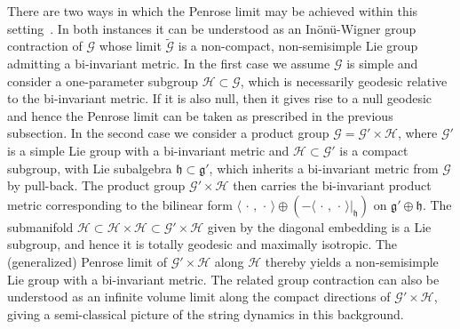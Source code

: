 \documentclass[11pt,a4paper]{article}
\begin{document}
There are two ways in which the Penrose limit may be achieved within
this setting~\cite{BFP1}. In both instances it can be understood as an
In\"on\"u-Wigner group contraction of $\mathcal{G}$ whose limit
$\widetilde{\mathcal{G}}$ is a non-compact, non-semisimple Lie group
admitting a bi-invariant metric. In the first case we assume $\mathcal
G$ is simple and consider a one-parameter subgroup
$\mathcal{H}\subset\mathcal{G}$, which is necessarily geodesic
relative to the bi-invariant metric. If it is also null, then it gives
rise to a null geodesic and hence the Penrose limit can be taken as
prescribed in the previous subsection. In the second case we consider
a product group $\mathcal{G}=\mathcal{G}'\times\mathcal{H}$, where
$\mathcal{G}'$ is a simple Lie group with a bi-invariant metric and
$\mathcal{H}\subset \mathcal{G}'$ is a compact subgroup, with Lie subalgebra
$\mathfrak{h}\subset\mathfrak{g}'$, which inherits a bi-invariant
metric from $\mathcal{G}$ by pull-back. The product group
$\mathcal{G}'\times \mathcal{H}$ then carries the bi-invariant product
metric corresponding to the bilinear form
$\langle\,\cdot\,,\,\cdot\,\rangle\oplus
(-\langle\,\cdot\,,\,\cdot\,\rangle|_{\mathfrak{h}})$ on
$\mathfrak{g}'\oplus\mathfrak{h}$. The submanifold $\mathcal{H}\subset
\mathcal{H}\times\mathcal{H}\subset\mathcal{G}'\times \mathcal{H}$
given by the diagonal embedding is a Lie subgroup, and hence it is
totally geodesic and maximally isotropic. The (generalized) Penrose
limit of $\mathcal{G}'\times\mathcal{H}$ along $\mathcal{H}$ thereby
yields a non-semisimple Lie group with a bi-invariant metric. The
related group contraction can also be understood as an infinite volume limit
along the compact directions of $\mathcal{G}'\times \mathcal{H}$,
giving a semi-classical picture of the string dynamics in this
background.
\end{document}
